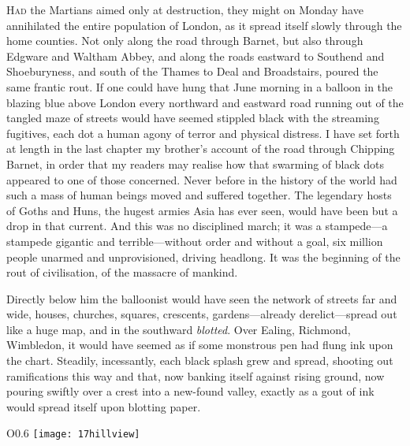 

\lettrine[lines=4,findent=2pt]{H}{ad} the Martians aimed only at destruction, they might on Monday have annihilated the entire population of London, as it spread itself slowly through the home counties. Not only along the road through Barnet, but also through Edgware and Waltham Abbey, and along the roads eastward to Southend and Shoeburyness, and south of the Thames to Deal and Broadstairs, poured the same frantic rout. If one could have hung that June morning in a balloon in the blazing blue above London every northward and eastward road running out of the tangled maze of streets would have seemed stippled black with the streaming fugitives, each dot a human agony of terror and physical distress. I have set forth at length in the last chapter my brother's account of the road through Chipping Barnet, in order that my readers may realise how that swarming of black dots appeared to one of those concerned. Never before in the history of the world had such a mass of human beings moved and suffered together. The legendary hosts of Goths and Huns, the hugest armies Asia has ever seen, would have been but a drop in that current. And this was no disciplined march; it was a stampede—a stampede gigantic and terrible—without order and without a goal, six million people unarmed and unprovisioned, driving headlong. It was the beginning of the rout of civilisation, of the massacre of mankind.

Directly below him the balloonist would have seen the network of streets far and wide, houses, churches, squares, crescents, gardens—already derelict—spread out like a huge map, and in the southward \textit{blotted}. Over Ealing, Richmond, Wimbledon, it would have seemed as if some monstrous pen had flung ink upon the chart. Steadily, incessantly, each black splash grew and spread, shooting out ramifications this way and that, now banking itself against rising ground, now pouring swiftly over a crest into a new-found valley, exactly as a gout of ink would spread itself upon blotting paper.

\begin{wrapfigure}{O}{0.6\textwidth}
\centering
\texttt{[image: 17hillview]}
\end{wrapfigure}

